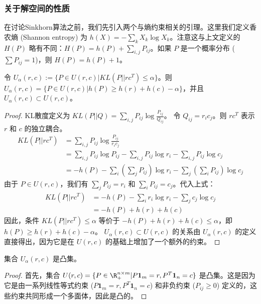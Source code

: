 \documentclass[lang=cn,newtx,10pt,scheme=chinese,chinesefont=nofont,citestyle=gb7714-2015, bibstyle=gb7714-2015]{elegantbook}
\begin{document}
\begin{refsection}

\subsubsection{关于解空间的性质}
在讨论Sinkhorn算法之前，我们先引入两个与熵约束相关的引理。这里我们定义香农熵 (Shannon entropy) 为 $h(X) = -\sum_k X_k \log X_k$。注意这与上文定义的 $H(P)$ 略有不同：$H(P) = h(P) + \sum_{i,j} P_{ij}$。如果 $P$ 是一个概率分布 ($\sum P_{ij}=1$)，则 $H(P) = h(P)+1$。


\begin{lemma}
令 $U_\alpha(r,c) := \{P \in U(r,c) | KL(P || rc^T) \le \alpha\}$。则 $U_\alpha(r,c) = \{P \in U(r,c) | h(P) \ge h(r) + h(c) - \alpha\}$，并且 $U_\alpha(r,c) \subset U(r,c)$。
\end{lemma}
\begin{proof}
KL散度定义为 $KL(P || Q) = \sum_{i,j} P_{ij} \log \frac{P_{ij}}{Q_{ij}}$。
令 $Q_{ij} = r_i c_j$。则 $rc^T$ 表示 $r$ 和 $c$ 的独立耦合。
\begin{align*}
    KL(P || rc^T) &= \sum_{i,j} P_{ij} \log \frac{P_{ij}}{r_i c_j} \\
    &= \sum_{i,j} P_{ij} \log P_{ij} - \sum_{i,j} P_{ij} \log r_i - \sum_{i,j} P_{ij} \log c_j \\
    &= -h(P) - \sum_i \left(\sum_j P_{ij}\right) \log r_i - \sum_j \left(\sum_i P_{ij}\right) \log c_j
\end{align*}
由于 $P \in U(r,c)$，我们有 $\sum_j P_{ij} = r_i$ 和 $\sum_i P_{ij} = c_j$。代入上式：
\begin{align*}
    KL(P || rc^T) &= -h(P) - \sum_i r_i \log r_i - \sum_j c_j \log c_j \\
    &= -h(P) + h(r) + h(c)
\end{align*}
因此，条件 $KL(P || rc^T) \le \alpha$ 等价于 $-h(P) + h(r) + h(c) \le \alpha$，即 $h(P) \ge h(r) + h(c) - \alpha$。
$U_\alpha(r,c) \subset U(r,c)$ 的关系由 $U_\alpha(r,c)$ 的定义直接得出，因为它是在 $U(r,c)$ 的基础上增加了一个额外的约束。
\end{proof}

\begin{lemma}
集合 $U_\alpha(r,c)$ 是凸集。
\end{lemma}
\begin{proof}
首先，集合 $U(r,c) = \{ P \in \R_+^{n \times m} | P\mathbf{1}_m = r, P^T\mathbf{1}_n = c \}$ 是凸集。这是因为它是由一系列线性等式约束 ($P\mathbf{1}_m = r, P^T\mathbf{1}_n = c$) 和非负约束 ($P_{ij} \ge 0$) 定义的，这些约束共同形成一个多面体，因此是凸的。


\end{proof}
\end{refsection}
\end{document}
